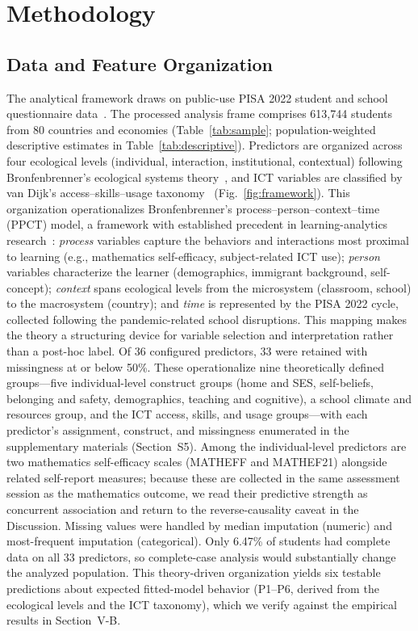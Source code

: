 \documentclass[journal]{IEEEtran}
\begin{document}
\section{Methodology}
\subsection{Data and Feature Organization}
The analytical framework draws on public-use PISA 2022 student and school questionnaire data~\cite{OECD_2022_database}. The processed analysis frame comprises 613,744 students from 80 countries and economies (Table~\ref{tab:sample}; population-weighted descriptive estimates in Table~\ref{tab:descriptive}). Predictors are organized across four ecological levels (individual, interaction, institutional, contextual) following Bronfenbrenner's ecological systems theory~\cite{Bronfenbrenner_1979,Bronfenbrenner_1994}, and ICT variables are classified by van Dijk's access--skills--usage taxonomy~\cite{van_Dijk_2005,van_Dijk_2020} (Fig.~\ref{fig:framework}). This organization operationalizes Bronfenbrenner's process--person--context--time (PPCT) model, a framework with established precedent in learning-analytics research~\cite{tan2017ecological}: \emph{process} variables capture the behaviors and interactions most proximal to learning (e.g., mathematics self-efficacy, subject-related ICT use); \emph{person} variables characterize the learner (demographics, immigrant background, self-concept); \emph{context} spans ecological levels from the microsystem (classroom, school) to the macrosystem (country); and \emph{time} is represented by the PISA 2022 cycle, collected following the pandemic-related school disruptions. This mapping makes the theory a structuring device for variable selection and interpretation rather than a post-hoc label. Of 36 configured predictors, 33 were retained with missingness at or below 50\%. These operationalize nine theoretically defined groups---five individual-level construct groups (home and SES, self-beliefs, belonging and safety, demographics, teaching and cognitive), a school climate and resources group, and the ICT access, skills, and usage groups---with each predictor's assignment, construct, and missingness enumerated in the supplementary materials (Section~S5). Among the individual-level predictors are two mathematics self-efficacy scales (MATHEFF and MATHEF21) alongside related self-report measures; because these are collected in the same assessment session as the mathematics outcome, we read their predictive strength as concurrent association and return to the reverse-causality caveat in the Discussion. Missing values were handled by median imputation (numeric) and most-frequent imputation (categorical). Only 6.47\% of students had complete data on all 33 predictors, so complete-case analysis would substantially change the analyzed population. This theory-driven organization yields six testable predictions about expected fitted-model behavior (P1--P6, derived from the ecological levels and the ICT taxonomy), which we verify against the empirical results in Section~V-B.
\end{document}
